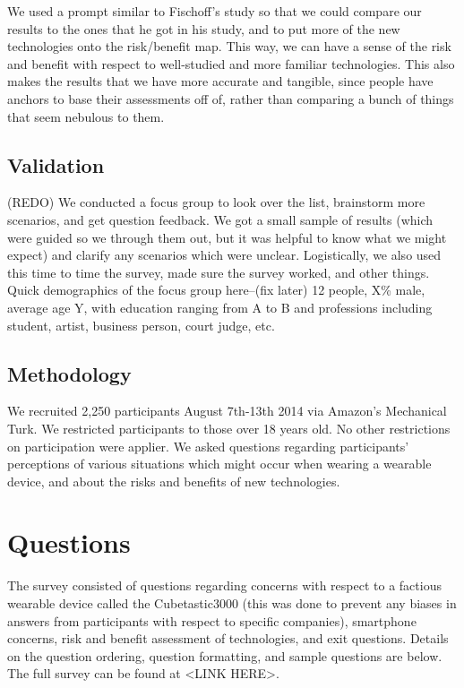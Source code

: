 \documentclass{acm_proc_article-sp}
\begin{document}
We used a prompt similar to Fischoff's study so that we could compare our results to the ones that he got in his study, and to put more of the new technologies onto the risk/benefit map. This way, we can have a sense of the risk and benefit with respect to well-studied and more familiar technologies. This also makes the results that we have more accurate and tangible, since people have anchors to base their assessments off of, rather than comparing a bunch of things that seem nebulous to them.

\subsection{Validation}
(REDO) We conducted a focus group to look over the list, brainstorm more scenarios,  and get question feedback. We got a small sample of results (which were guided so we through them out, but it was helpful to know what we might expect) and clarify any scenarios which were unclear. Logistically, we also used this time to time the survey, made sure the survey worked, and other things. Quick demographics of the focus group here--(fix later) 12 people, X\% male, average age Y, with education ranging from A to B and professions including student, artist, business person, court judge, etc.  

\subsection{Methodology}
We recruited 2,250 participants August 7th-13th 2014 via Amazon's Mechanical Turk. We restricted participants to those over 18 years old. No other restrictions on participation were applier. We asked questions regarding participants' perceptions of various situations which might occur when wearing a wearable device, and about the risks and benefits of new technologies.
 
 
\section{Questions}
The survey consisted of questions regarding concerns with respect to a factious wearable device called the Cubetastic3000 (this was done to prevent any biases in answers from participants with respect to specific companies), smartphone concerns, risk and benefit assessment of technologies, and exit questions. Details on the question ordering, question formatting, and sample questions are below. The full survey can be found at <LINK HERE>. 
\end{document}
